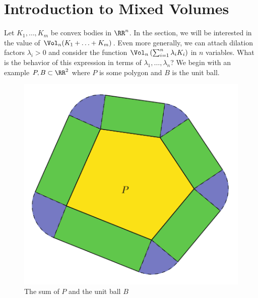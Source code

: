 \documentclass[11pt]{article}
\begin{document}
\newpage

\section{Introduction to Mixed Volumes}

Let $K_1, \ldots, K_m$ be convex bodies in $\RR^n$. In the section, we will be interested in the value of $\Vol_n (K_1 + \ldots + K_m)$. Even more generally, we can attach dilation factors $\lambda_i > 0$ and consider the function $\Vol_n \left ( \sum_{i = 1}^n \lambda_i K_i \right )$ in $n$ variables. What is the behavior of this expression in terms of $\lambda_1, \ldots, \lambda_n$? We begin with an example $P, B\subset \RR^2$ where $P$ is some polygon and $B$ is the unit ball. 

\begin{figure}[h]
\begin{center}
    \includegraphics[scale = 0.7]{../images/image7.png}
    \caption{The sum of $P$ and the unit ball $B$}
    \label{minkowski-sum-example}
\end{center}
\end{figure}
\end{document}
